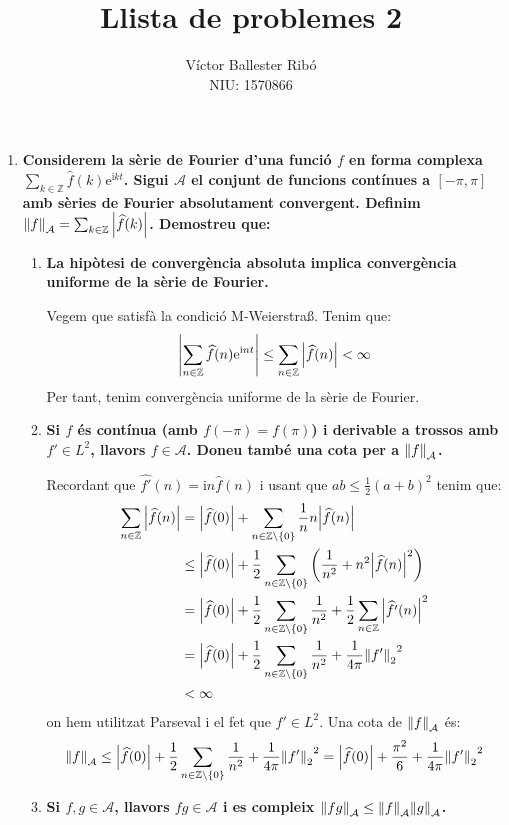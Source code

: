 \documentclass[10pt,a4paper]{article}
\title{\bfseries\Large Llista de problemes 2}
\author{Víctor Ballester Ribó\\NIU: 1570866}
\date{\parbox{\linewidth}{\centering
  Anàlisi Harmònica\endgraf
  Grau en Matemàtiques\endgraf
  Universitat Autònoma de Barcelona\endgraf
  Març de 2023}}
\newcommand{\ZZ}{\ensuremath{\mathbb{Z}}} %
\newcommand{\ii}{\mathrm{i}} %
\theoremstyle{definition}
\renewcommand{\exp}[1]{\mathrm{e}^{#1}} %
\begin{document}
\maketitle

\begin{enumerate}
  \item \textbf{Considerem la sèrie de Fourier d'una funció $f$ en forma complexa $\sum_{k\in\ZZ}\widehat{f}(k)\exp{\ii kt}$. Sigui $\mathcal{A}$ el conjunt de funcions contínues a $[-\pi,\pi]$ amb sèries de Fourier absolutament convergent. Definim $\norm{f}_{\mathcal{A}}=\sum_{k\in\ZZ}\abs{\widehat{f}(k)}$. Demostreu que:}
        \begin{enumerate}
          \item \textbf{La hipòtesi de convergència absoluta implica convergència uniforme de la sèrie de Fourier.}

                Vegem que satisfà la condició M-Weierstra\ss. Tenim que:
                $$\left|\sum_{n\in\ZZ}\widehat{f}(n)\exp{\ii n t} \right|\leq\sum_{n\in\ZZ}\abs{\widehat{f}(n)}< \infty$$
                Per tant, tenim convergència uniforme de la sèrie de Fourier.
          \item \textbf{Si $f$ és contínua (amb $f(-\pi)=f(\pi)$) i derivable a trossos amb $f'\in L^2$, llavors $f\in\mathcal{A}$. Doneu també una cota per a $\norm{f}_{\mathcal{A}}$.}

                Recordant que $\widehat{f'}(n)=\ii n \widehat{f}(n)$ i usant que $ab\leq\frac{1}{2}{\left(a+b\right)}^2$ tenim que:
                \begin{align*}
                  \sum_{n\in\ZZ}\abs{\widehat{f}(n)} & =\abs{\widehat{f}(0)}+ \sum_{n\in\ZZ\setminus\{0\}}\frac{1}{n}n\abs{\widehat{f}(n)}                                         \\
                                                     & \leq\abs{\widehat{f}(0)}+\frac{1}{2}\sum_{n\in\ZZ\setminus\{0\}}\left(\frac{1}{n^2} + n^2\abs{\widehat{f}(n)}^2\right)      \\
                                                     & =\abs{\widehat{f}(0)}+\frac{1}{2}\sum_{n\in\ZZ\setminus\{0\}}\frac{1}{n^2}+\frac{1}{2}\sum_{n\in\ZZ}\abs{\widehat{f'}(n)}^2 \\
                                                     & =\abs{\widehat{f}(0)}+\frac{1}{2}\sum_{n\in\ZZ\setminus\{0\}}\frac{1}{n^2}+\frac{1}{4\pi}{\norm{f'}_2}^2                    \\
                                                     & <\infty
                \end{align*}
                on hem utilitzat Parseval i el fet que $f'\in L^2$. Una cota de $\norm{f}_\mathcal{A}$ és:
                $$\norm{f}_\mathcal{A}\leq\abs{\widehat{f}(0)}+\frac{1}{2}\sum_{n\in\ZZ\setminus\{0\}}\frac{1}{n^2}+\frac{1}{4\pi}{\norm{f'}_2}^2 =\abs{\widehat{f}(0)}+\frac{\pi^2}{6}+\frac{1}{4\pi}{\norm{f'}_2}^2 $$
          \item \textbf{Si $f,g\in\mathcal{A}$, llavors $fg\in\mathcal{A}$ i es compleix $\norm{fg}_{\mathcal{A}}\leq \norm{f}_{\mathcal{A}}\norm{g}_{\mathcal{A}}$.}


\end{enumerate}
\end{enumerate}
\end{document}
